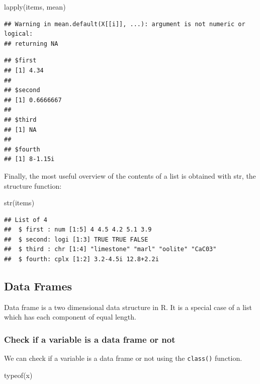 \documentclass[
]{book}
\newenvironment{Shaded}{\begin{snugshade}}{\end{snugshade}}
\newcommand{\FunctionTok}[1]{\textcolor[rgb]{0.00,0.00,0.00}{#1}}
\newcommand{\NormalTok}[1]{#1}
\theoremstyle{definition}
\theoremstyle{definition}
\theoremstyle{definition}
\theoremstyle{definition}
\theoremstyle{remark}
\begin{document}
\begin{Shaded}
\begin{Highlighting}[]
\FunctionTok{lapply}\NormalTok{(items, mean)}
\end{Highlighting}
\end{Shaded}

\begin{verbatim}
## Warning in mean.default(X[[i]], ...): argument is not numeric or logical:
## returning NA
\end{verbatim}

\begin{verbatim}
## $first
## [1] 4.34
## 
## $second
## [1] 0.6666667
## 
## $third
## [1] NA
## 
## $fourth
## [1] 8-1.15i
\end{verbatim}

Finally, the most useful overview of the contents of a list is obtained with str, the structure function:

\begin{Shaded}
\begin{Highlighting}[]
\FunctionTok{str}\NormalTok{(items)}
\end{Highlighting}
\end{Shaded}

\begin{verbatim}
## List of 4
##  $ first : num [1:5] 4 4.5 4.2 5.1 3.9
##  $ second: logi [1:3] TRUE TRUE FALSE
##  $ third : chr [1:4] "limestone" "marl" "oolite" "CaC03"
##  $ fourth: cplx [1:2] 3.2-4.5i 12.8+2.2i
\end{verbatim}

\hypertarget{data-frames}{%
\subsection{Data Frames}\label{data-frames}}

Data frame is a two dimensional data structure in R. It is a special case of a list which has each component of equal length.

\hypertarget{check-if-a-variable-is-a-data-frame-or-not}{%
\subsubsection{Check if a variable is a data frame or not}\label{check-if-a-variable-is-a-data-frame-or-not}}

We can check if a variable is a data frame or not using the \texttt{class()} function.

\begin{Shaded}
\begin{Highlighting}[]
\FunctionTok{typeof}\NormalTok{(x)}
\end{Highlighting}
\end{Shaded}
\end{document}
